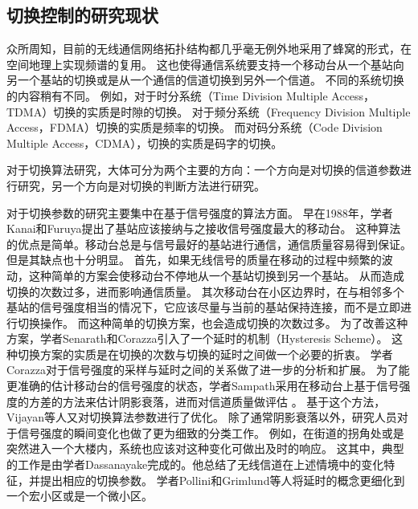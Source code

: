 \subsection{切换控制的研究现状}

\par
众所周知，目前的无线通信网络拓扑结构都几乎毫无例外地采用了蜂窝的形式，在空间地理上实现频谱的复用。
这也使得通信系统要支持一个移动台从一个基站向另一个基站的切换或是从一个通信的信道切换到另外一个信道。
不同的系统切换的内容稍有不同。
例如，对于时分系统（Time Division Multiple Access，TDMA）切换的实质是时隙的切换。
对于频分系统（Frequency Division Multiple Access，FDMA）切换的实质是频率的切换。
而对码分系统（Code Division Multiple Access，CDMA），切换的实质是码字的切换。

对于切换算法研究，大体可分为两个主要的方向：一个方向是对切换的信道参数进行研究，另一个方向是对切换的判断方法进行研究。

对于切换参数的研究主要集中在基于信号强度的算法方面。
早在1988年，学者Kanai和Furuya提出了基站应该接纳与之接收信号强度最大的移动台\cite{Kanai1988}。
这种算法的优点是简单。移动台总是与信号最好的基站进行通信，通信质量容易得到保证。
但是其缺点也十分明显。
首先，如果无线信号的质量在移动的过程中频繁的波动，这种简单的方案会使移动台不停地从一个基站切换到另一个基站。
从而造成切换的次数过多，进而影响通信质量。
其次移动台在小区边界时，在与相邻多个基站的信号强度相当的情况下，它应该尽量与当前的基站保持连接，而不是立即进行切换操作。
而这种简单的切换方案，也会造成切换的次数过多。
为了改善这种方案，学者Senarath和Corazza引入了一个延时的机制（Hysteresis Scheme）\cite{345338}。
这种切换方案的实质是在切换的次数与切换的延时之间做一个必要的折衷。
学者Corazza对于信号强度的采样与延时之间的关系做了进一步的分析和扩展\cite{345424}。
为了能更准确的估计移动台的信号强度的状态，学者Sampath采用在移动台上基于信号强度的方差的方法来估计阴影衰落，进而对信道质量做评估 \cite{368926}。
基于这个方法，Vijayan等人又对切换算法参数进行了优化\cite{528368}。
除了通常阴影衰落以外，研究人员对于信号强度的瞬间变化也做了更为细致的分类工作。
例如，在街道的拐角处或是突然进入一个大楼内，系统也应该对这种变化可做出及时的响应\cite{350270}。
这其中，典型的工作是由学者Dassanayake完成的\cite{220848}。他总结了无线信道在上述情境中的变化特征，并提出相应的切换参数。
学者Pollini和Grimlund等人将延时的概念更细化到一个宏小区或是一个微小区\cite{486807}\cite{140543}。

